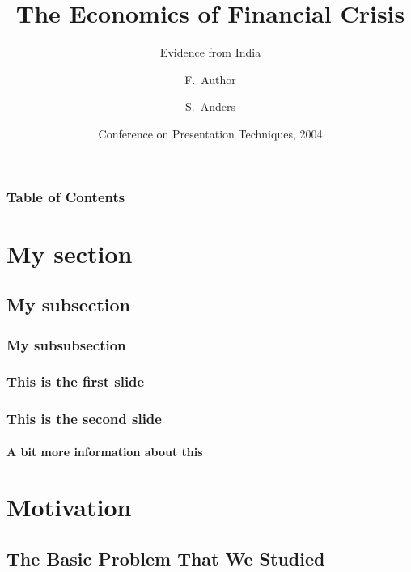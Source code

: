 \documentclass[10pt]{beamer}
\title[Crisis] %
{The Economics of Financial Crisis}
\subtitle{Evidence from India}
\author[Author, Anders] %
{F.~Author\inst{1} \and S.~Anders\inst{2}}
\institute[Universities Here and There] %
{
  \inst{1}%
  Institute of Computer Science\\
  University Here
  \and
  \inst{2}%
  Institute of Theoretical Philosophy\\
  University There
}
\date[KPT 2004] %
{Conference on Presentation Techniques, 2004}
\begin{document}




\frame{\titlepage}
\addtocounter{framenumber}{-1}

\begin{frame}
\frametitle{Table of Contents}
\end{frame}



\section[Section]{My section}
\subsection[Subsection]{My subsection}
\subsubsection[Subsubsection]{My subsubsection}

\begin{frame}
    \frametitle{This is the first slide}
  \end{frame}
  \begin{frame}
    \frametitle{This is the second slide}
    \framesubtitle{A bit more information about this}
  \end{frame}

\section{Motivation}

\subsection{The Basic Problem That We Studied}
\end{document}
